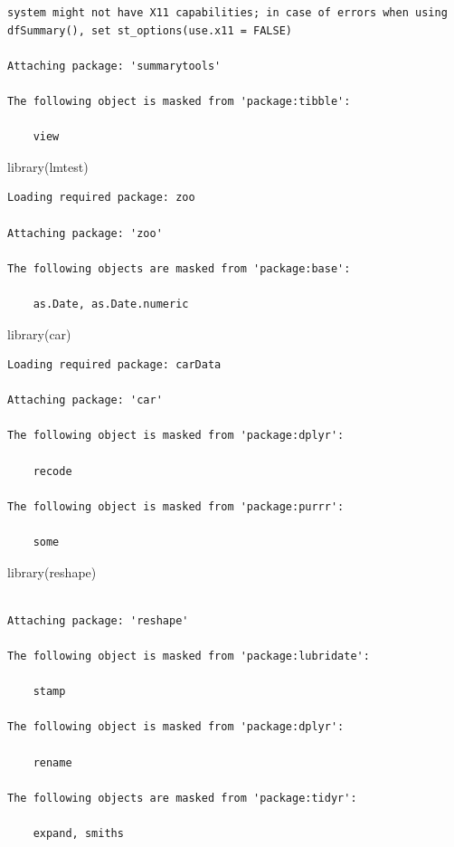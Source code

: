 \documentclass[
  letterpaper,
  DIV=11,
  numbers=noendperiod]{scrartcl}
\newenvironment{Shaded}{\begin{snugshade}}{\end{snugshade}}
\newcommand{\FunctionTok}[1]{\textcolor[rgb]{0.28,0.35,0.67}{#1}}
\newcommand{\NormalTok}[1]{\textcolor[rgb]{0.00,0.23,0.31}{#1}}
\begin{document}
\begin{verbatim}
system might not have X11 capabilities; in case of errors when using dfSummary(), set st_options(use.x11 = FALSE)

Attaching package: 'summarytools'

The following object is masked from 'package:tibble':

    view
\end{verbatim}

\begin{Shaded}
\begin{Highlighting}[]
\FunctionTok{library}\NormalTok{(lmtest)}
\end{Highlighting}
\end{Shaded}

\begin{verbatim}
Loading required package: zoo

Attaching package: 'zoo'

The following objects are masked from 'package:base':

    as.Date, as.Date.numeric
\end{verbatim}

\begin{Shaded}
\begin{Highlighting}[]
\FunctionTok{library}\NormalTok{(car)}
\end{Highlighting}
\end{Shaded}

\begin{verbatim}
Loading required package: carData

Attaching package: 'car'

The following object is masked from 'package:dplyr':

    recode

The following object is masked from 'package:purrr':

    some
\end{verbatim}

\begin{Shaded}
\begin{Highlighting}[]
\FunctionTok{library}\NormalTok{(reshape)}
\end{Highlighting}
\end{Shaded}

\begin{verbatim}

Attaching package: 'reshape'

The following object is masked from 'package:lubridate':

    stamp

The following object is masked from 'package:dplyr':

    rename

The following objects are masked from 'package:tidyr':

    expand, smiths
\end{verbatim}
\end{document}
